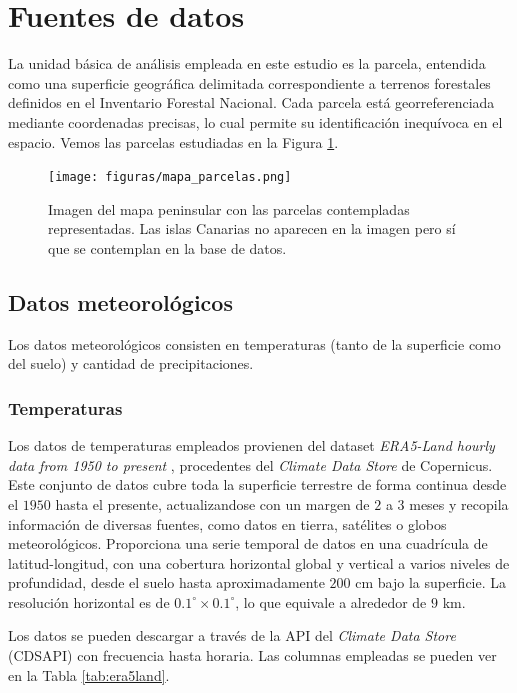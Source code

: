 \section{Fuentes de datos}

La unidad básica de análisis empleada en este estudio es la parcela, entendida como una superficie geográfica delimitada correspondiente a terrenos forestales definidos en el Inventario Forestal Nacional. Cada parcela está georreferenciada mediante coordenadas precisas, lo cual permite su identificación inequívoca en el espacio. Vemos las parcelas estudiadas en la Figura \ref{fig:parcelas}.

\begin{figure}[H]
    \centering
    \texttt{[image: figuras/mapa\_parcelas.png]}
    \caption{\small Imagen del mapa peninsular con las parcelas contempladas representadas. Las islas Canarias no aparecen en la imagen pero sí que se contemplan en la base de datos.}
    \label{fig:parcelas}
\end{figure}

\subsection{Datos meteorológicos}
Los datos meteorológicos consisten en temperaturas (tanto de la superficie como del suelo) y cantidad de precipitaciones.

\subsubsection*{Temperaturas}


Los datos de temperaturas empleados provienen del dataset \textit{ERA5-Land hourly data from 1950 to present} \cite{copuernicus_temps}, procedentes del \textit{Climate Data Store} de Copernicus. Este conjunto de datos cubre toda la superficie terrestre de forma continua desde el $1950$ hasta el presente, actualizandose con un margen de $2$ a $3$ meses y recopila información de diversas fuentes, como datos en tierra, satélites o globos meteorológicos. Proporciona una serie temporal de datos en una cuadrícula de latitud-longitud, con una cobertura horizontal global y vertical a varios niveles de profundidad, desde el suelo hasta aproximadamente $200$ cm bajo la superficie. La resolución horizontal es de $0.1^\circ \times 0.1^\circ$, lo que equivale a alrededor de $9$ km.

\medskip

Los datos se pueden descargar a través de la API del \textit{Climate Data Store} (CDSAPI) \cite{copernicus_api} con frecuencia hasta horaria. Las columnas empleadas se pueden ver en la Tabla \ref{tab:era5land}.

